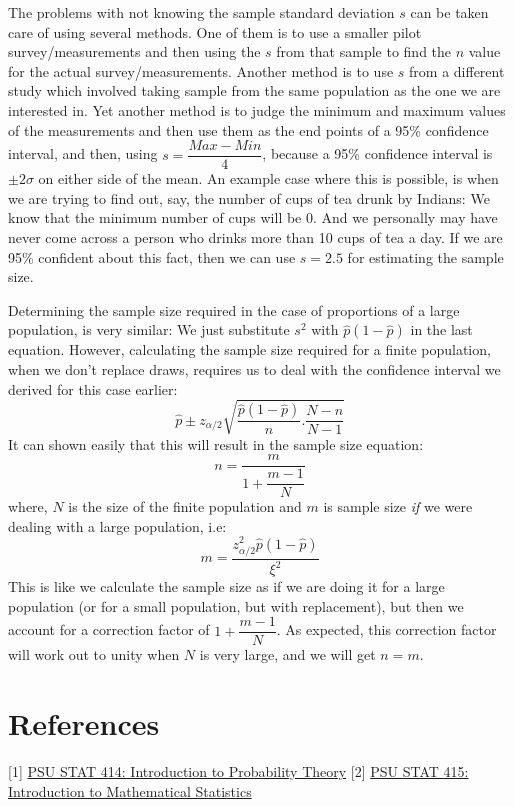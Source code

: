 The problems with not knowing the sample standard deviation $s$ can be taken care of using several methods. One of them is to use a smaller pilot survey/measurements and then using the $s$ from that sample to find the $n$ value for the actual survey/measurements. Another method is to use $s$ from a different study which involved taking sample from the same population as the one we are interested in. Yet another method is to judge the minimum and maximum values of the measurements and then use them as the end points of a 95\% confidence interval, and then, using \( s = \dfrac{Max-Min}{4} \), because a 95\% confidence interval is $\pm 2\sigma$ on either side of the mean. An example case where this is possible, is when we are trying to find out, say, the number of cups of tea drunk by Indians: We know that the minimum number of cups will be 0. And we personally may have never come across a person who drinks more than 10 cups of tea a day. If we are 95\% confident about this fact, then we can use $s = 2.5$ for estimating the sample size.

Determining the sample size required in the case of proportions of a large population, is very similar: We just substitute $s^2$ with \( \hat{p}(1-\hat{p}) \) in the last equation. However, calculating the sample size required for a finite population, when we don't replace draws, requires us to deal with the confidence interval we derived for this case earlier:
	\[ \hat{p}\pm z_{\alpha/2}\sqrt{\dfrac{\hat{p}(1-\hat{p})}{n} . \dfrac{N-n}{N-1}} \]
It can shown easily that this will result in the sample size equation:
	\[ n=\dfrac{m}{1+\dfrac{m-1}{N}} \]
where, $N$ is the size of the finite population and $m$ is sample size \emph{if} we were dealing with a large population, i.e:
	\[ m=\dfrac{z^2_{\alpha/2}\hat{p}(1-\hat{p})}{\xi^2}\]
This is like we calculate the sample size as if we are doing it for a large population (or for a small population, but with replacement), but then we account for a correction factor of \( 1+\dfrac{m-1}{N} \). As expected, this correction factor will work out to unity when $N$ is very large, and we will get $n=m$.

\section{References}
[1] \href{https://online.stat.psu.edu/stat414/}{PSU STAT 414: Introduction to Probability Theory}
[2] \href{https://online.stat.psu.edu/stat415/}{PSU STAT 415: Introduction to Mathematical Statistics}


